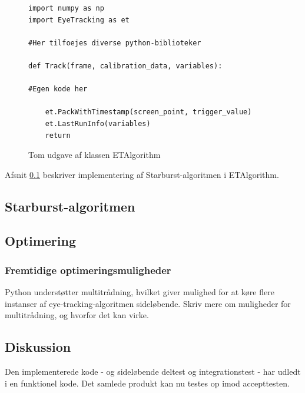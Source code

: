 \documentclass[rapport.tex]{subfiles}
\begin{document}
\begin{figure}
	\caption{Tom udgave af klassen ETAlgorithm}
	\label{list:emptyalg}
\begin{lstlisting}
import numpy as np
import EyeTracking as et

#Her tilfoejes diverse python-biblioteker

def Track(frame, calibration_data, variables):

#Egen kode her 

	et.PackWithTimestamp(screen_point, trigger_value)
	et.LastRunInfo(variables)
	return
\end{lstlisting}
\end{figure}

	
	
	Afsnit \ref{StarburstImpl} beskriver implementering af Starburst-algoritmen i ETAlgorithm.
	\subsection{Starburst-algoritmen}
	\label{StarburstImpl}
	\subsection{Optimering}
	
	\subsubsection{Fremtidige optimeringsmuligheder}
	Python understøtter multitrådning, hvilket giver mulighed for at køre flere instanser af eye-tracking-algoritmen sideløbende. Skriv mere om muligheder for multitrådning, og hvorfor det kan virke.
	\subsection{Diskussion}
	Den implementerede kode - og sideløbende deltest og integrationstest - har udledt i en funktionel kode. Det samlede produkt kan nu testes op imod accepttesten.
\end{document}
